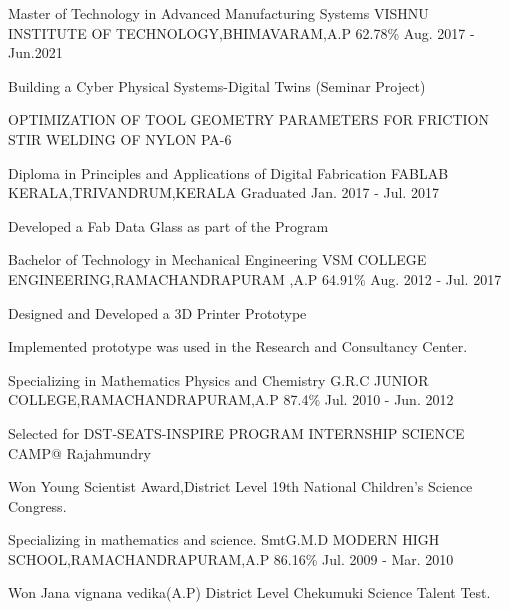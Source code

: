 \begin{cventries}
  \cventry
    {Master of Technology in Advanced Manufacturing Systems}
    {VISHNU INSTITUTE OF TECHNOLOGY,BHIMAVARAM,A.P}
    {62.78\%}
    {Aug. 2017 - Jun.2021}
    {
      \begin{cvitems}
        \item {Building a Cyber Physical Systems-Digital Twins (Seminar Project)}  
        \item {OPTIMIZATION OF TOOL GEOMETRY PARAMETERS FOR FRICTION STIR WELDING OF NYLON PA-6 }
      \end{cvitems}
    }
  \cventry
    {Diploma in Principles and Applications of Digital Fabrication}
    {FABLAB KERALA,TRIVANDRUM,KERALA}
    {Graduated}
    {Jan. 2017 - Jul. 2017}
    {
      \begin{cvitems}
        \item {Developed a Fab Data Glass as part of the Program }
      \end{cvitems}
    }
  \cventry
    {Bachelor of Technology in Mechanical Engineering}
    {VSM COLLEGE ENGINEERING,RAMACHANDRAPURAM ,A.P}
    {64.91\%}
    {Aug. 2012 - Jul. 2017}
    {
      \begin{cvitems}
        \item {Designed and Developed a 3D Printer Prototype }
        \item {Implemented prototype was used in the Research and Consultancy Center.}
      \end{cvitems} 
    }
  \cventry
    {Specializing in Mathematics Physics and Chemistry}
    {G.R.C JUNIOR COLLEGE,RAMACHANDRAPURAM,A.P}
    {87.4\%}
    {Jul. 2010 - Jun. 2012}
    {
      \begin{cvitems}
	\item{Selected for DST-SEATS-INSPIRE PROGRAM INTERNSHIP SCIENCE CAMP@ Rajahmundry}
        \item {Won Young Scientist Award,District Level 19th National Children's Science Congress.}
      \end{cvitems}
    }
  \cventry
    {Specializing in mathematics and science.}
    {SmtG.M.D MODERN HIGH SCHOOL,RAMACHANDRAPURAM,A.P}
    {86.16\%}
    {Jul. 2009 - Mar. 2010}
    {
      \begin{cvitems}
        \item {Won Jana vignana vedika(A.P) District Level Chekumuki Science Talent Test.}
      \end{cvitems}
}
\end{cventries}
